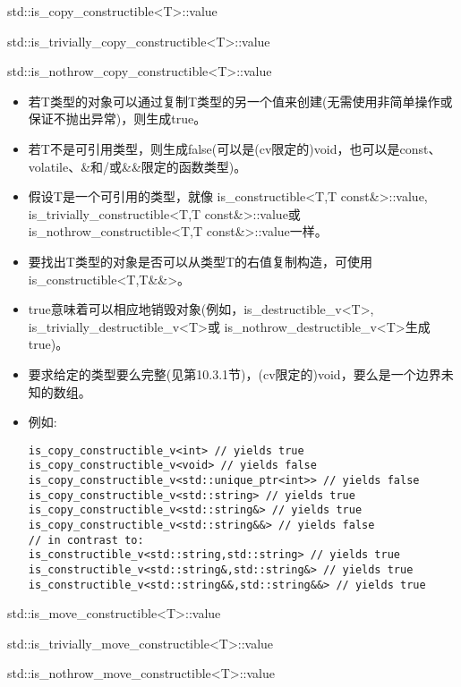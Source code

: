 std::is\_copy\_constructible<T>::value

std::is\_trivially\_copy\_constructible<T>::value

std::is\_nothrow\_copy\_constructible<T>::value

\begin{itemize}
\item 
若T类型的对象可以通过复制T类型的另一个值来创建(无需使用非简单操作或保证不抛出异常)，则生成true。

\item 
若T不是可引用类型，则生成false(可以是(cv限定的)void，也可以是const、volatile、\&和/或\&\&限定的函数类型)。

\item 
假设T是一个可引用的类型，就像 is\_constructible<T,T const\&>::value, is\_trivially\_constructible<T,T const\&>::value或is\_nothrow\_constructible<T,T const\&>::value一样。

\item 
要找出T类型的对象是否可以从类型T的右值复制构造，可使用 is\_constructible<T,T\&\&>。

\item 
true意味着可以相应地销毁对象(例如，is\_destructible\_v<T>, is\_trivially\_destructible\_v<T>或 is\_nothrow\_destructible\_v<T>生成true)。

\item 
要求给定的类型要么完整(见第10.3.1节)，(cv限定的)void，要么是一个边界未知的数组。

\item 
例如:
\begin{lstlisting}[style=styleCXX]
is_copy_constructible_v<int> // yields true
is_copy_constructible_v<void> // yields false
is_copy_constructible_v<std::unique_ptr<int>> // yields false
is_copy_constructible_v<std::string> // yields true
is_copy_constructible_v<std::string&> // yields true
is_copy_constructible_v<std::string&&> // yields false
// in contrast to:
is_constructible_v<std::string,std::string> // yields true
is_constructible_v<std::string&,std::string&> // yields true
is_constructible_v<std::string&&,std::string&&> // yields true
\end{lstlisting}

\end{itemize}

std::is\_move\_constructible<T>::value

std::is\_trivially\_move\_constructible<T>::value

std::is\_nothrow\_move\_constructible<T>::value

